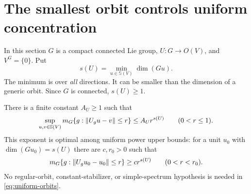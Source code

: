 \section{The smallest orbit controls uniform concentration}
\label{sec:strata}
In this section $G$ is a compact connected Lie group, $U:G\to O(V)$,
and $V^G=\{0\}$. Put
\begin{equation}\label{eq:min-orbit}
 s(U)=\min_{u\in\mathbb S(V)}\dim(G u).
\end{equation}
The minimum is over \emph{all} directions. It can be smaller than the
dimension of a generic orbit. Since $G$ is connected, $s(U)\ge1$.

\begin{theorem}\label{thm:uniform-orbits}
There is a finite constant $A_U\ge1$ such that
\begin{equation}\label{eq:uniform-orbits}
 \sup_{u,v\in\mathbb S(V)}m_G\{g:\lVert U_gu-v\rVert\le r\}
       \le A_U r^{s(U)}\qquad(0<r\le1).
\end{equation}
This exponent is optimal among uniform power upper bounds: for a unit
$u_0$ with $\dim(G u_0)=s(U)$ there are $c,r_0>0$ such that
\begin{equation}\label{eq:orbit-sharpness}
 m_G\{g:\lVert U_gu_0-u_0\rVert\le r\}\ge c r^{s(U)}
 \qquad(0<r<r_0).
\end{equation}
No regular-orbit, constant-stabilizer, or simple-spectrum hypothesis
is needed in \eqref{eq:uniform-orbits}.
\end{theorem}
